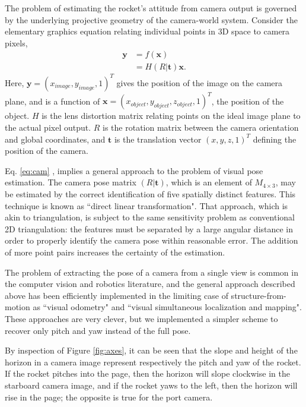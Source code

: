 \documentclass{article}
\begin{document}
The problem of estimating the rocket's attitude from camera output is governed by the underlying projective geometry of the camera-world system. Consider the elementary graphics equation relating individual points in 3D space to camera pixels,
\begin{align}
\label{eq:cam}
\mathbf{y} &= f(\mathbf{x}) \\
&= H (R | \mathbf{t}) \mathbf{x}.
\end{align}
Here, $\mathbf{y} = (x_{image}, y_{image}, 1)^T$ gives the position of the image on the camera plane, and is a function of $\mathbf{x} = (x_{object}, y_{object}, z_{object}, 1)^T$, the position of the object. $H$ is the lens distortion matrix relating points on the ideal image plane to the actual pixel output. $R$ is the rotation matrix between the camera orientation and global coordinates, and $\mathbf{t}$ is the translation vector $(x, y, z, 1)^T$ defining the position of the camera.

Eq. \ref{eq:cam} , implies a general approach to the problem of visual pose estimation. The camera pose matrix $(R | \mathbf{t})$, which is an element of $M_{4\times3}$, may be estimated by the correct identification of five spatially distinct features. This technique is known as ``direct linear transformation". That approach, which is akin to triangulation, is subject to the same sensitivity problem as conventional 2D triangulation: the features must be separated by a large angular distance in order to properly identify the camera pose within reasonable error. The addition of more point pairs increases the certainty of the estimation.

The problem of extracting the pose of a camera from a single view is common in the computer vision and robotics literature, and the general approach described above has been efficiently implemented in the limiting case of structure-from-motion as ``visual odometry" and ``visual simultaneous localization and mapping". These approaches are very clever, but we implemented a simpler scheme to recover only pitch and yaw instead of the full pose.

By inspection of Figure \ref{fig:axes}, it can be seen that the slope and height of the horizon in a camera image represent respectively the pitch and yaw of the rocket. If the rocket pitches into the page, then the horizon will slope clockwise in the starboard camera image, and if the rocket yaws to the left, then the horizon will rise in the page; the opposite is true for the port camera. 
\end{document}
